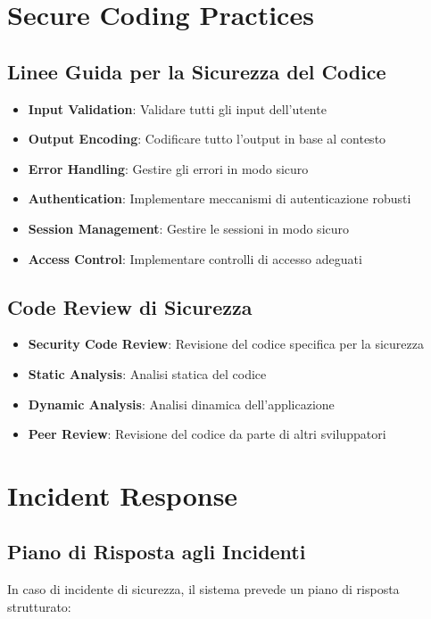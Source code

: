 \section{Secure Coding Practices}

\subsection{Linee Guida per la Sicurezza del Codice}
\begin{itemize}
    \item \textbf{Input Validation}: Validare tutti gli input dell'utente
    \item \textbf{Output Encoding}: Codificare tutto l'output in base al contesto
    \item \textbf{Error Handling}: Gestire gli errori in modo sicuro
    \item \textbf{Authentication}: Implementare meccanismi di autenticazione robusti
    \item \textbf{Session Management}: Gestire le sessioni in modo sicuro
    \item \textbf{Access Control}: Implementare controlli di accesso adeguati
\end{itemize}

\subsection{Code Review di Sicurezza}
\begin{itemize}
    \item \textbf{Security Code Review}: Revisione del codice specifica per la sicurezza
    \item \textbf{Static Analysis}: Analisi statica del codice
    \item \textbf{Dynamic Analysis}: Analisi dinamica dell'applicazione
    \item \textbf{Peer Review}: Revisione del codice da parte di altri sviluppatori
\end{itemize}

\section{Incident Response}

\subsection{Piano di Risposta agli Incidenti}
In caso di incidente di sicurezza, il sistema prevede un piano di risposta strutturato:

